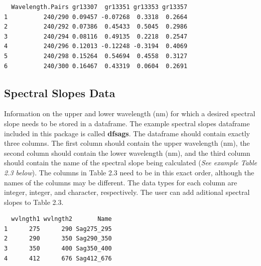 \documentclass[a4paper,11pt]{article}\usepackage[]{graphicx}\usepackage[]{color}
\makeatletter
\newenvironment{kframe}{%
 \def\at@end@of@kframe{}%
 \ifinner\ifhmode%
  \def\at@end@of@kframe{\end{minipage}}%
  \begin{minipage}{\columnwidth}%
 \fi\fi%
 \def\FrameCommand##1{\hskip\@totalleftmargin \hskip-\fboxsep
 \colorbox{shadecolor}{##1}\hskip-\fboxsep
     \hskip-\linewidth \hskip-\@totalleftmargin \hskip\columnwidth}%
 \MakeFramed {\advance\hsize-\width
   \@totalleftmargin\z@ \linewidth\hsize
   \@setminipage}}%
 {\par\unskip\endMakeFramed%
 \at@end@of@kframe}
\newenvironment{knitrout}{}{} %
\makeatother
\begin{document}
\begin{knitrout}
\color{fgcolor}\begin{kframe}
\begin{verbatim}
  Wavelength.Pairs gr13307  gr13351 gr13353 gr13357
1          240/290 0.09457 -0.07268  0.3318  0.2664
2          240/292 0.07386  0.45433  0.5045  0.2986
3          240/294 0.08116  0.49135  0.2218  0.2547
4          240/296 0.12013 -0.12248 -0.3194  0.4069
5          240/298 0.15264  0.54694  0.4558  0.3127
6          240/300 0.16467  0.43319  0.0604  0.2691
\end{verbatim}
\end{kframe}
\end{knitrout}

\subsection{Spectral Slopes Data}
Information on the upper and lower wavelength (nm) for which a desired spectral slope needs to be stored in a dataframe. The example spectral slopes dataframe included in this package is called \textbf{dfsags}. The dataframe should contain exactly three columns. The first column should contain the upper wavelength (nm), the second column should contain the lower wavelength (nm), and the third column should contain the name of the spectral slope being calculated (\emph{See example Table 2.3 below}). The columns in Table 2.3 need to be in this exact order, although the names of the columns may be different. The data types for each column are integer, integer, and character, respectively. The user can add aditional spectral slopes to Table 2.3. 

\begin{knitrout}
\color{fgcolor}\begin{kframe}
\begin{verbatim}
  wvlngth1 wvlngth2       Name
1      275      290 Sag275_295
2      290      350 Sag290_350
3      350      400 Sag350_400
4      412      676 Sag412_676
\end{verbatim}
\end{kframe}
\end{knitrout}

\end{document}
